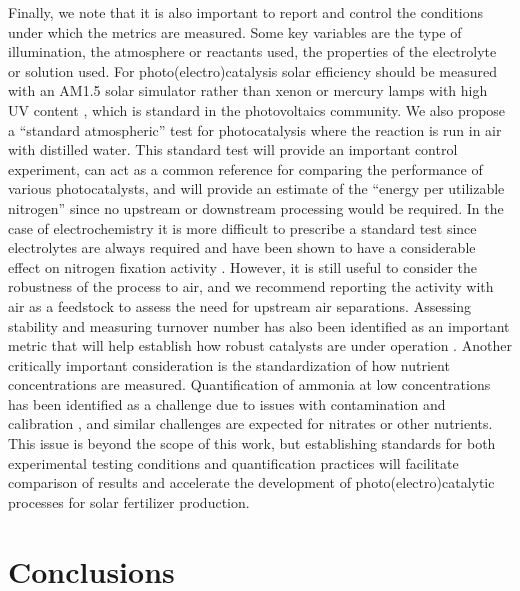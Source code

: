 Finally, we note that it is also important to report and control the conditions under which the metrics are measured. Some key variables are the type of illumination, the atmosphere or reactants used, the properties of the electrolyte or solution used. For photo(electro)catalysis solar efficiency should be measured with an AM1.5 solar simulator rather than xenon or mercury lamps with high UV content \cite{AM_1.5}, which is standard in the photovoltaics community. We also propose a ``standard atmospheric'' test for photocatalysis where the reaction is run in air with distilled water. This standard test will provide an important control experiment, can act as a common reference for comparing the performance of various photocatalysts, and will provide an estimate of the ``energy per utilizable nitrogen'' since no upstream or downstream processing would be required. In the case of electrochemistry it is more difficult to prescribe a standard test since electrolytes are always required and have been shown to have a considerable effect on nitrogen fixation activity \cite{Song_2018,Zhou_2017,Sheets_2018,Cui_2018}. However, it is still useful to consider the robustness of the process to air, and we recommend reporting the activity with air as a feedstock to assess the need for upstream air separations. Assessing stability and measuring turnover number has also been identified as an important metric that will help establish how robust catalysts are under operation \cite{Suryanto_2019}. Another critically important consideration is the standardization of how nutrient concentrations are measured. Quantification of ammonia at low concentrations has been identified as a challenge due to issues with contamination and calibration \cite{Greenlee_2018,Gao_2018,Zhao_2019,Cui_2018,Suryanto_2019}, and similar challenges are expected for nitrates or other nutrients. This issue is beyond the scope of this work, but establishing standards for both experimental testing conditions and quantification practices will facilitate comparison of results and accelerate the development of photo(electro)catalytic processes for solar fertilizer production.

\section{Conclusions}

